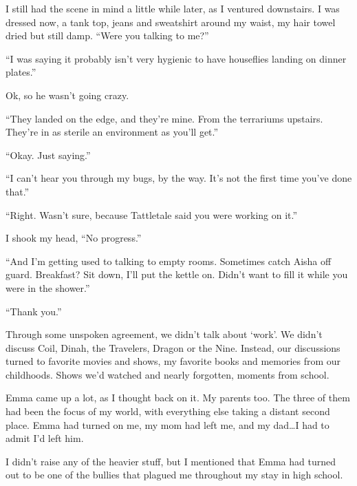 I still had the scene in mind a little while later, as I ventured downstairs.  I was dressed now, a tank top, jeans and sweatshirt around my waist, my hair towel dried but still damp.  ``Were you talking to me?''



``I was saying it probably isn't very hygienic to have houseflies landing on dinner plates.''



Ok, so he wasn't going crazy.



``They landed on the edge, and they're mine.  From the terrariums upstairs.  They're in as sterile an environment as you'll get.''



``Okay.  Just saying.''



``I can't hear you through my bugs, by the way.  It's not the first time you've done that.''



``Right.  Wasn't sure, because Tattletale said you were working on it.''



I shook my head, ``No progress.''



``And I'm getting used to talking to empty rooms.  Sometimes catch Aisha off guard.  Breakfast?  Sit down, I'll put the kettle on.  Didn't want to fill it while you were in the shower.''



``Thank you.''



Through some unspoken agreement, we didn't talk about `work'.  We didn't discuss Coil, Dinah, the Travelers, Dragon or the Nine.  Instead, our discussions turned to favorite movies and shows, my favorite books and memories from our childhoods.  Shows we'd watched and nearly forgotten, moments from school.



Emma came up a lot, as I thought back on it.  My parents too.  The three of them had been the focus of my world, with everything else taking a distant second place.  Emma had turned on me, my mom had left me, and my dad\ldots I had to admit I'd left him.



I didn't raise any of the heavier stuff, but I mentioned that Emma had turned out to be one of the bullies that plagued me throughout my stay in high school.



